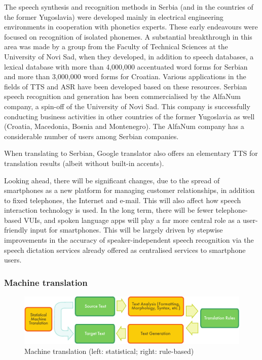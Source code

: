 \begin{multicols}{2}
The speech synthesis and recognition methods in Serbia (and in the countries of the former Yugoslavia) were developed mainly in electrical engineering environments in cooperation with phonetics experts. These early endeavours were focused on recognition of isolated phonemes. A substantial breakthrough in this area was made by a group from the Faculty of Technical Sciences at the University of Novi Sad, when they developed, in addition to speech databases, a lexical database with more than 4,000,000 accentuated word forms for Serbian and more than 3,000,000 word forms for Croatian. Various applications in the fields of TTS and ASR have been developed based on these resources. Serbian speech recognition and generation has been commercialised by the AlfaNum company, a spin-off of the University of Novi Sad. This company is successfully conducting business activities in other countries of the former Yugoslavia as well (Croatia, Macedonia, Bosnia and Montenegro). The AlfaNum company has a considerable number of users among Serbian companies. 

When translating to Serbian, Google translator also offers an elementary TTS for translation results (albeit without built-in accents).


Looking ahead, there will be significant changes, due to the spread of smartphones as a new platform for managing customer relationships, in addition to fixed telephones, the Internet and e-mail. This will also affect how speech interaction technology is used. In the long term, there will be fewer telephone-based VUIs, and spoken language apps will play a far more central role as a user-friendly input for smartphones. This will be largely driven by stepwise improvements in the accuracy of speaker-independent speech recognition via the speech dictation services already offered as centralised services to smartphone users.

 \subsubsection {Machine translation}

\begin{figure}[htb]
  \center
  \includegraphics[width=\textwidth]{../_media/english/machine_translation}
  \caption{Machine translation (left: statistical; right: rule-based)}
  \label{fig:mtarch_en}
\end{figure}
 



\end{multicols}
